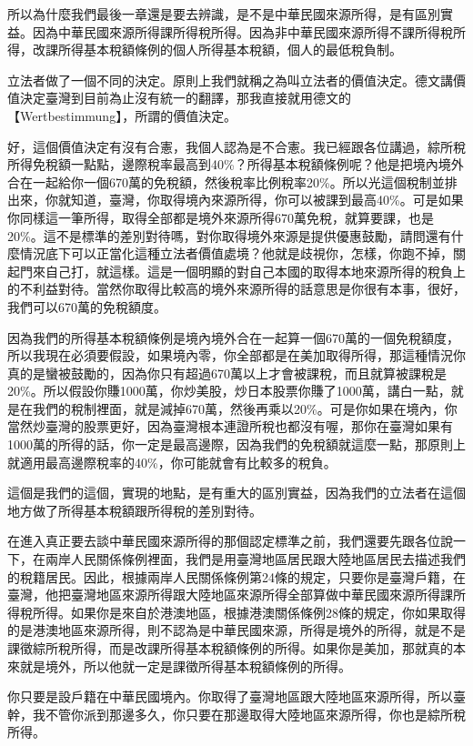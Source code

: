 \documentclass[oneside,sub3section]{ctexbook}
\begin{document}
所以為什麼我們最後一章還是要去辨識，是不是中華民國來源所得，是有區別實益。因為中華民國來源所得課所得稅所得。因為非中華民國來源所得不課所得稅所得，改課所得基本稅額條例的個人所得基本稅額，個人的最低稅負制。

立法者做了一個不同的決定。原則上我們就稱之為叫立法者的價值決定。德文講價值決定臺灣到目前為止沒有統一的翻譯，那我直接就用德文的【Wertbestimmung】，所謂的價值決定。

好，這個價值決定有沒有合憲，我個人認為是不合憲。我已經跟各位講過，綜所稅所得免稅額一點點，邊際稅率最高到40\%？所得基本稅額條例呢？他是把境內境外合在一起給你一個670萬的免稅額，然後稅率比例稅率20\%。所以光這個稅制並排出來，你就知道，臺灣，你取得境內來源所得，你可以被課到最高40\%。可是如果你同樣這一筆所得，取得全部都是境外來源所得670萬免稅，就算要課，也是20\%。這不是標準的差別對待嗎，對你取得境外來源是提供優惠鼓勵，請問還有什麼情況底下可以正當化這種立法者價值處境？他就是歧視你，怎樣，你跑不掉，關起門來自己打，就這樣。這是一個明顯的對自己本國的取得本地來源所得的稅負上的不利益對待。當然你取得比較高的境外來源所得的話意思是你很有本事，很好，我們可以670萬的免稅額度。

因為我們的所得基本稅額條例是境內境外合在一起算一個670萬的一個免稅額度，所以我現在必須要假設，如果境內零，你全部都是在美加取得所得，那這種情況你真的是蠻被鼓勵的，因為你只有超過670萬以上才會被課稅，而且就算被課稅是20\%。所以假設你賺1000萬，你炒美股，炒日本股票你賺了1000萬，講白一點，就是在我們的稅制裡面，就是減掉670萬，然後再乘以20\%。可是你如果在境內，你當然炒臺灣的股票更好，因為臺灣根本連證所稅也都沒有喔，那你在臺灣如果有1000萬的所得的話，你一定是最高邊際，因為我們的免稅額就這麼一點，那原則上就適用最高邊際稅率的40\%，你可能就會有比較多的稅負。

這個是我們的這個，實現的地點，是有重大的區別實益，因為我們的立法者在這個地方做了所得基本稅額跟所得稅的差別對待。

在進入真正要去談中華民國來源所得的那個認定標準之前，我們還要先跟各位說一下，在兩岸人民關係條例裡面，我們是用臺灣地區居民跟大陸地區居民去描述我們的稅籍居民。因此，根據兩岸人民關係條例第24條的規定，只要你是臺灣戶籍，在臺灣，他把臺灣地區來源所得跟大陸地區來源所得全部算做中華民國來源所得課所得稅所得。如果你是來自於港澳地區，根據港澳關係條例28條的規定，你如果取得的是港澳地區來源所得，則不認為是中華民國來源，所得是境外的所得，就是不是課徵綜所稅所得，而是改課所得基本稅額條例的所得。如果你是美加，那就真的本來就是境外，所以他就一定是課徵所得基本稅額條例的所得。

你只要是設戶籍在中華民國境內。你取得了臺灣地區跟大陸地區來源所得，所以臺幹，我不管你派到那邊多久，你只要在那邊取得大陸地區來源所得，你也是綜所稅所得。
\end{document}
